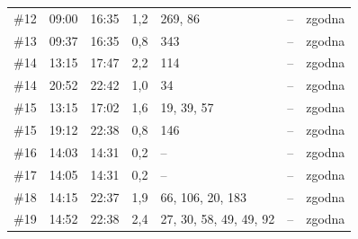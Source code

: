 \documentclass[10pt,a4paper]{article}
\begin{document}
{\begin{longtable}{@{}l l l r p{5.2cm} r l@{}}
\#12 & 09:00 & 16:35 & 1,2 & 269, 86 & -- & zgodna \\
\#13 & 09:37 & 16:35 & 0,8 & 343 & -- & zgodna \\
\#14 & 13:15 & 17:47 & 2,2 & 114 & -- & zgodna \\
\#14 & 20:52 & 22:42 & 1,0 & 34 & -- & zgodna \\
\#15 & 13:15 & 17:02 & 1,6 & 19, 39, 57 & -- & zgodna \\
\#15 & 19:12 & 22:38 & 0,8 & 146 & -- & zgodna \\
\#16 & 14:03 & 14:31 & 0,2 & -- & -- & zgodna \\
\#17 & 14:05 & 14:31 & 0,2 & -- & -- & zgodna \\
\#18 & 14:15 & 22:37 & 1,9 & 66, 106, 20, 183 & -- & zgodna \\
\#19 & 14:52 & 22:38 & 2,4 & 27, 30, 58, 49, 49, 92 & -- & zgodna \\
\end{longtable}}
\end{document}
